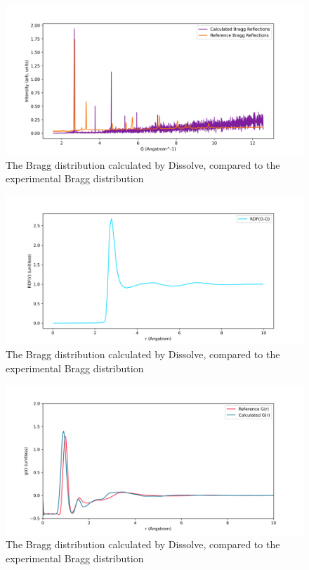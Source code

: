 \documentclass[a4paper,11pt]{article}
\begin{document}
\begin{figure}[H]
  \centering
  \includegraphics[width=\textwidth]{images/Bragg.png}
  \caption{The Bragg distribution calculated by Dissolve, compared to the experimental Bragg distribution}
  \label{fig:bragg}
\end{figure}
\begin{figure}[H]
  \centering
  \includegraphics[width=\textwidth]{images/RDF-liquid.png}
  \caption{The Bragg distribution calculated by Dissolve, compared to the experimental Bragg distribution}
  \label{fig:rdf-liquid}
\end{figure}
\begin{figure}[H]
  \centering
  \includegraphics[width=\textwidth]{images/GR-liquid.png}
  \caption{The Bragg distribution calculated by Dissolve, compared to the experimental Bragg distribution}
  \label{fig:gr-liquid}
\end{figure}
\end{document}
